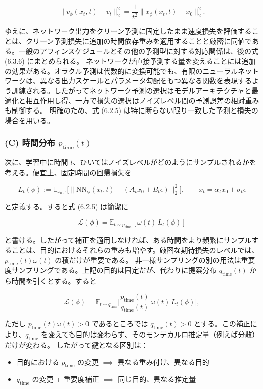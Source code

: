 \[
\|v_\phi(x_t, t) - v_t\|_2^2 = \frac{1}{t^2}\|x_\phi(x_t, t) - x_0\|_2^2.
\]


ゆえに、ネットワーク出力をクリーン予測に固定したまま速度損失を評価することは、クリーン予測損失に追加の時間依存重みを適用することと厳密に同値である。一般のアフィンスケジュールとその他の予測型に対する対応関係は、後の式 (6.3.6) にまとめられる。
ネットワークが直接予測する量を変えることには追加の効果がある。オラクル予測は代数的に変換可能でも、有限のニューラルネットワークは、異なる出力スケールとパラメータ勾配をもつ異なる関数を表現するよう訓練される。したがってネットワーク予測の選択はモデルアーキテクチャと最適化と相互作用し得、一方で損失の選択はノイズレベル間の予測誤差の相対重みも制御する。
明確のため、式 (6.2.5) は特に断らない限り一致した予測と損失の場合を用いる。

\subsubsection*{(C) 時間分布 $p_{\mathrm{time}}(t)$}


次に、学習中に時間 $t$、ひいてはノイズレベルがどのようにサンプルされるかを考える。便宜上、固定時間の回帰損失を

\[
L_t(\phi) := \mathbb{E}_{x_0,\epsilon}\bigl[\|\mathrm{NN}_\phi(x_t, t) - (A_t x_0 + B_t\epsilon)\|_2^2\bigr], \qquad x_t = \alpha_t x_0 + \sigma_t\epsilon
\]


と定義する。すると式 (6.2.5) は簡潔に

\[
\mathcal{L}(\phi) = \mathbb{E}_{t\sim p_{\mathrm{time}}}[\omega(t)\, L_t(\phi)]
\]


と書ける。したがって補正を適用しなければ、ある時間をより頻繁にサンプルすることは、目的におけるそれらの重みも増やす。厳密な期待損失のレベルでは、$p_{\mathrm{time}}(t)\omega(t)$ の積だけが重要である。
非一様サンプリングの別の用法は重要度サンプリングである。上記の目的は固定だが、代わりに提案分布 $q_{\mathrm{time}}(t)$ から時間を引くとする。すると

\[
\mathcal{L}(\phi) = \mathbb{E}_{t\sim q_{\mathrm{time}}}\Biggl[\frac{p_{\mathrm{time}}(t)}{q_{\mathrm{time}}(t)}\,\omega(t)\, L_t(\phi)\Biggr],
\]


ただし $p_{\mathrm{time}}(t)\omega(t) > 0$ であるところでは $q_{\mathrm{time}}(t) > 0$ とする。この補正により、$q_{\mathrm{time}}$ を変えても目的は変わらず、そのモンテカルロ推定量（例えば分散）だけが変わる。
したがって鍵となる区別は：

\begin{itemize}
\item 目的における $p_{\mathrm{time}}$ の変更 $\implies$ 異なる重み付け、異なる目的
\item $q_{\mathrm{time}}$ の変更 + 重要度補正 $\implies$ 同じ目的、異なる推定量
\end{itemize}


